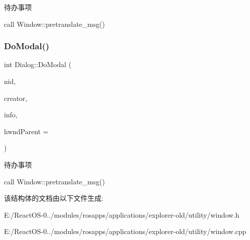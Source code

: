 \begin{DoxyRefDesc}{待办事项}
\item[\hyperlink{todo__todo000085}{待办事项}]call Window\+::pretranslate\+\_\+msg() \end{DoxyRefDesc}
\mbox{\label{struct_dialog_a70b9e81d26f712c4079ae96c9009edbb}} 
\subsubsection{\texorpdfstring{Do\+Modal()}{DoModal()}\hspace{0.1cm}{\footnotesize\ttfamily [2/2]}}
{\footnotesize\ttfamily int Dialog\+::\+Do\+Modal (\begin{DoxyParamCaption}\item[{U\+I\+NT}]{nid,  }\item[{C\+R\+E\+A\+T\+O\+R\+F\+U\+N\+C\+\_\+\+I\+N\+FO}]{creator,  }\item[{const \hyperlink{interfacevoid}{void} $\ast$}]{info,  }\item[{\hyperlink{interfacevoid}{H\+W\+ND}}]{hwnd\+Parent = {} }\end{DoxyParamCaption})\hspace{0.3cm}{\ttfamily [static]}}

\begin{DoxyRefDesc}{待办事项}
\item[\hyperlink{todo__todo000086}{待办事项}]call Window\+::pretranslate\+\_\+msg() \end{DoxyRefDesc}


该结构体的文档由以下文件生成\+:\begin{DoxyCompactItemize}
\item 
E\+:/\+React\+O\+S-\/0../modules/rosapps/applications/explorer-\/old/utility/window.\+h\item 
E\+:/\+React\+O\+S-\/0../modules/rosapps/applications/explorer-\/old/utility/window.\+cpp\end{DoxyCompactItemize}
